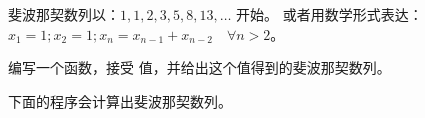 \begin{Exercise}[title={斐波那契},difficulty=5]
\label{ex:fibonaci}
\Question\label{ex:fibonaci q1}
斐波那契数列以：$1, 1, 2, 3, 5, 8, 13, \ldots$ 开始。
或者用数学形式表达：$ x_1 = 1; x_2 = 1; x_n = x_{n-1} +
x_{n-2}\quad\forall n > 2 $。

编写一个函数，接受  值，并给出这个值得到的斐波那契数列。

\end{Exercise}

\begin{Answer}
\Question
下面的程序会计算出斐波那契数列。


\showremarks
\end{Answer}
